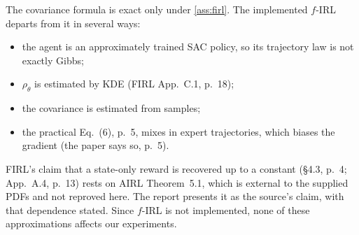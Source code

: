 \begin{remark}\label{rem:firl-approx}
The covariance formula is exact only under \cref{ass:firl}. The implemented $f$-IRL departs from it in several ways:
\begin{itemize}[nosep]
\item the agent is an approximately trained SAC policy, so its trajectory law is not exactly Gibbs;
\item $\rho_\theta$ is estimated by KDE (FIRL App.~C.1, p.~18);
\item the covariance is estimated from samples;
\item the practical Eq.~(6), p.~5, mixes in expert trajectories, which biases the gradient (the paper says so, p.~5).
\end{itemize}
FIRL's claim that a state-only reward is recovered up to a constant (\S4.3, p.~4; App.~A.4, p.~13) rests on AIRL Theorem~5.1, which is external to the supplied PDFs and not reproved here. The report presents it as the source's claim, with that dependence stated.
Since $f$-IRL is not implemented, none of these approximations affects our experiments.
\end{remark}
